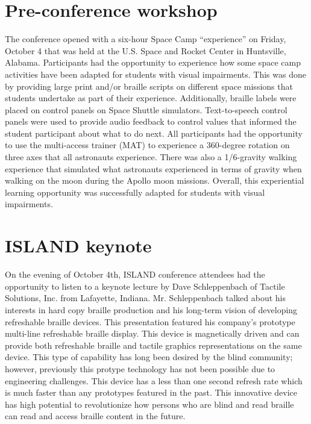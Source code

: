 \documentclass[11.5pt]{sig-alternate} %
\begin{document}
\clearpage
\begin{large}
\section*{Pre-conference workshop}

The conference opened with a six-hour Space Camp “experience” on Friday, October 4 that was held at the U.S. Space and Rocket Center in Huntsville, Alabama. Participants had the opportunity to experience how some space camp activities have been adapted for students with visual impairments. This was done by providing large print and/or braille scripts on different space missions that students undertake as part of their experience. Additionally, braille labels were placed on control panels on Space Shuttle simulators. Text-to-speech control panels were used to provide audio feedback to control values that informed the student participant about what to do next.  All participants had the opportunity to use the multi-access trainer (MAT) to experience a 360-degree rotation on three axes that all astronauts experience. There was also a 1/6-gravity walking experience that simulated what astronauts experienced in terms of gravity when walking on the moon during the Apollo moon missions. Overall, this experiential learning opportunity was successfully adapted for students with visual impairments.


\section*{ISLAND keynote}
On the evening of October 4th, ISLAND conference attendees had the opportunity to listen to a keynote lecture by Dave Schleppenbach of Tactile Solutions, Inc. from Lafayette, Indiana. Mr. Schleppenbach talked about his interests in hard copy braille production and his long-term vision of developing refreshable braille devices. This presentation featured his company’s prototype multi-line refreshable braille display. This device is magnetically driven and can provide both refreshable braille and tactile graphics representations on the same device. This type of capability has long been desired by the blind community; however, previously this protype technology has not been possible due to engineering challenges. This device has a less than one second refresh rate which is much faster than any prototypes featured in the past. This innovative device has high potential to revolutionize how persons who are blind and read braille can read and access braille content in the future.



\end{large}
\end{document}
